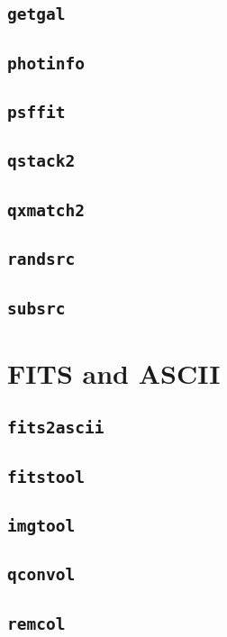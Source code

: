 \documentclass[12pt]{report}
\begin{document}
\subsection{\texttt{getgal}} 
\subsection{\texttt{photinfo}} 
\subsection{\texttt{psffit}} 
\subsection{\texttt{qstack2}} 
\subsection{\texttt{qxmatch2}} 
\subsection{\texttt{randsrc}} 
\subsection{\texttt{subsrc}} 

\section{FITS and ASCII \label{SEC:tool:fits}}
\subsection{\texttt{fits2ascii}} 
\subsection{\texttt{fitstool}} 
\subsection{\texttt{imgtool}} 
\subsection{\texttt{qconvol}} 
\subsection{\texttt{remcol}} 


\printindex
\end{document}
